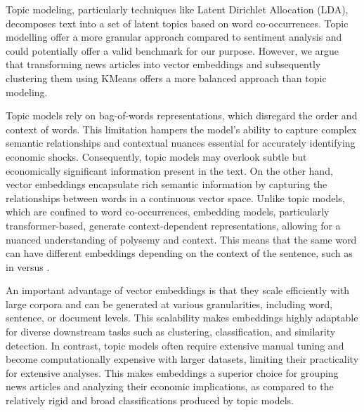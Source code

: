 Topic modeling, particularly techniques like Latent Dirichlet Allocation (LDA), decomposes text into a set of latent topics based on word co-occurrences. Topic modelling  offer a more granular approach compared to sentiment analysis and could potentially offer a valid benchmark for our purpose. However, we argue that transforming news articles into vector embeddings and subsequently clustering them using KMeans offers a more balanced approach than topic modeling.

Topic models rely on bag-of-words representations, which disregard the order and context of words. This limitation hampers the model's ability to capture complex semantic relationships and contextual nuances essential for accurately identifying economic shocks. Consequently, topic models may overlook subtle but economically significant information present in the text. On the other hand, vector embeddings encapsulate rich semantic information by capturing the relationships between words in a continuous vector space. Unlike topic models, which are confined to word co-occurrences, embedding models, particularly transformer-based, generate context-dependent representations, allowing for a nuanced understanding of polysemy and context. This means that the same word can have different embeddings depending on the context of the sentence, such as  in  versus . 


An important advantage of vector embeddings is that they scale efficiently with large corpora and can be generated at various granularities, including word, sentence, or document levels. This scalability makes embeddings highly adaptable for diverse downstream tasks such as clustering, classification, and similarity detection. In contrast, topic models often require extensive manual tuning and become computationally expensive with larger datasets, limiting their practicality for extensive analyses. This makes embeddings a superior choice for grouping news articles and analyzing their economic implications, as compared to the relatively rigid and broad classifications produced by topic models.

